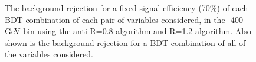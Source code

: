 \begin{figure}
\begin{center}
\caption{
The background rejection
for a fixed signal efficiency (70\%) of each BDT combination of
each pair of variables considered, in the -400 GeV bin using the anti-\kT R=0.8
algorithm and R=1.2 algorithm. Also shown is the background rejection
for a BDT combination of all of the variables considered.
}
\label{fig:pt300_comb2D}
\end{center}
\end{figure}


